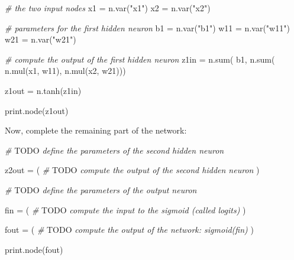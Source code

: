 \documentclass[
  a4paper,
]{article}
\newenvironment{Shaded}{\begin{snugshade}}{\end{snugshade}}
\newcommand{\AlertTok}[1]{\textcolor[rgb]{0.94,0.16,0.16}{#1}}
\newcommand{\CommentTok}[1]{\textcolor[rgb]{0.56,0.35,0.01}{\textit{#1}}}
\newcommand{\FunctionTok}[1]{\textcolor[rgb]{0.00,0.00,0.00}{#1}}
\newcommand{\NormalTok}[1]{#1}
\newcommand{\OtherTok}[1]{\textcolor[rgb]{0.56,0.35,0.01}{#1}}
\newcommand{\StringTok}[1]{\textcolor[rgb]{0.31,0.60,0.02}{#1}}
\begin{document}
\begin{Shaded}
\begin{Highlighting}[]
\CommentTok{\# the two input nodes}
\NormalTok{x1 }\OtherTok{=} \FunctionTok{n.var}\NormalTok{(}\StringTok{"x1"}\NormalTok{)}
\NormalTok{x2 }\OtherTok{=} \FunctionTok{n.var}\NormalTok{(}\StringTok{"x2"}\NormalTok{)}

\CommentTok{\# parameters for the first hidden neuron}
\NormalTok{b1 }\OtherTok{=} \FunctionTok{n.var}\NormalTok{(}\StringTok{"b1"}\NormalTok{)}
\NormalTok{w11 }\OtherTok{=} \FunctionTok{n.var}\NormalTok{(}\StringTok{"w11"}\NormalTok{)}
\NormalTok{w21 }\OtherTok{=} \FunctionTok{n.var}\NormalTok{(}\StringTok{"w21"}\NormalTok{)}

\CommentTok{\# compute the output of the first hidden neuron}
\NormalTok{z1in }\OtherTok{=} \FunctionTok{n.sum}\NormalTok{(}
\NormalTok{    b1,}
    \FunctionTok{n.sum}\NormalTok{(}
       \FunctionTok{n.mul}\NormalTok{(x1, w11),}
       \FunctionTok{n.mul}\NormalTok{(x2, w21)))}

\NormalTok{z1out }\OtherTok{=} \FunctionTok{n.tanh}\NormalTok{(z1in)}

\FunctionTok{print.node}\NormalTok{(z1out)}
\end{Highlighting}
\end{Shaded}

Now, complete the remaining part of the network:

\begin{Shaded}
\begin{Highlighting}[]
\CommentTok{\# }\AlertTok{TODO}\CommentTok{ define the parameters of the second hidden neuron}

\NormalTok{z2out }\OtherTok{=}\NormalTok{ (}
  \CommentTok{\# }\AlertTok{TODO}\CommentTok{ compute the output of the second hidden neuron}
\NormalTok{)}

\CommentTok{\# }\AlertTok{TODO}\CommentTok{ define the parameters of the output neuron}

\NormalTok{fin }\OtherTok{=}\NormalTok{ (}
  \CommentTok{\# }\AlertTok{TODO}\CommentTok{ compute the input to the sigmoid (called logits)}
\NormalTok{)}

\NormalTok{fout }\OtherTok{=}\NormalTok{ (}
  \CommentTok{\# }\AlertTok{TODO}\CommentTok{ compute the output of the network: sigmoid(fin)}
\NormalTok{)}

\FunctionTok{print.node}\NormalTok{(fout)}
\end{Highlighting}
\end{Shaded}
\end{document}
